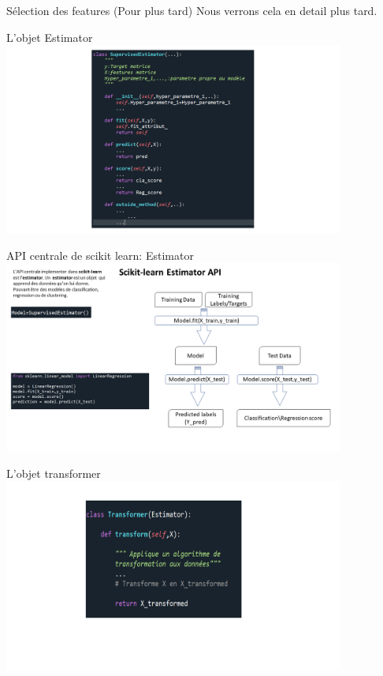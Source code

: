 \documentclass[9pt]{beamer}
\begin{document}
\begin{frame}{Sélection des features (Pour plus tard)}
Nous verrons cela en detail plus tard.
\end{frame}

\begin{frame}{L'objet Estimator}
\includegraphics[height=6.3cm]{Diapositive4.PNG}
\end{frame}

\begin{frame}{API centrale de scikit learn: Estimator}
\includegraphics[height=6.3cm]{Diapositive5.PNG}
\end{frame}


\begin{frame}{L'objet transformer}
\includegraphics[height=6.3cm]{Diapositive6.PNG}
\end{frame}
\end{document}
